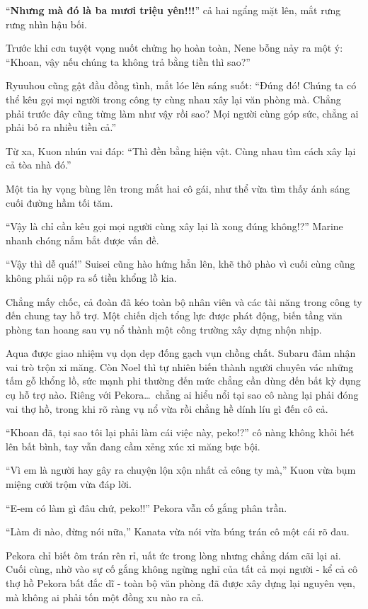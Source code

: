 \documentclass[../main.tex]{subfiles}
\begin{document}
``\textbf{Nhưng mà đó là ba mươi triệu yên!!!}'' cả hai ngẩng mặt lên, mắt rưng rưng nhìn hậu bối.

Trước khi cơn tuyệt vọng nuốt chửng họ hoàn toàn, Nene bỗng nảy ra một ý: ``Khoan, vậy nếu chúng ta không trả bằng tiền thì sao?''

Ryuuhou cũng gật đầu đồng tình, mắt lóe lên sáng suốt: ``Đúng đó! Chúng ta có thể kêu gọi mọi người trong công ty cùng nhau xây lại văn phòng mà. Chẳng phải trước đây cũng từng làm như vậy rồi sao? Mọi người cùng góp sức, chẳng ai phải bỏ ra nhiều tiền cả.''

Từ xa, Kuon nhún vai đáp: ``Thì đền bằng hiện vật. Cùng nhau tìm cách xây lại cả tòa nhà đó.''

Một tia hy vọng bùng lên trong mắt hai cô gái, như thể vừa tìm thấy ánh sáng cuối đường hầm tối tăm.

``Vậy là chỉ cần kêu gọi mọi người cùng xây lại là xong đúng không!?'' Marine nhanh chóng nắm bắt được vấn đề.

``Vậy thì dễ quá!'' Suisei cũng hào hứng hẳn lên, khẽ thở phào vì cuối cùng cũng không phải nộp ra số tiền khổng lồ kia.

\ct

Chẳng mấy chốc, cả đoàn đã kéo toàn bộ nhân viên và các tài năng trong công ty đến chung tay hỗ trợ. Một chiến dịch tổng lực được phát động, biến tầng văn phòng tan hoang sau vụ nổ thành một công trường xây dựng nhộn nhịp.

Aqua được giao nhiệm vụ dọn dẹp đống gạch vụn chồng chất. Subaru đảm nhận vai trò trộn xi măng. Còn Noel thì tự nhiên biến thành người chuyên vác những tấm gỗ khổng lồ, sức mạnh phi thường đến mức chẳng cần dùng đến bất kỳ dụng cụ hỗ trợ nào. Riêng với Pekora\dots\ chẳng ai hiểu nổi tại sao cô nàng lại phải đóng vai thợ hồ, trong khi rõ ràng vụ nổ vừa rồi chẳng hề dính líu gì đến cô cả.

``Khoan đã, tại sao tôi lại phải làm cái việc này, peko!?'' cô nàng không khỏi hét lên bất bình, tay vẫn đang cầm xẻng xúc xi măng bực bội.

``Vì em là người hay gây ra chuyện lộn xộn nhất cả công ty mà,'' Kuon vừa bụm miệng cười trộm vừa đáp lời.

``E-em có làm gì đâu chứ, peko!!'' Pekora vẫn cố gắng phân trần.

``Làm đi nào, đừng nói nữa,'' Kanata vừa nói vừa búng trán cô một cái rõ đau.

Pekora chỉ biết ôm trán rên rỉ, uất ức trong lòng nhưng chẳng dám cãi lại ai. Cuối cùng, nhờ vào sự cố gắng không ngừng nghỉ của tất cả mọi người - kể cả cô thợ hồ Pekora bất đắc dĩ - toàn bộ văn phòng đã được xây dựng lại nguyên vẹn, mà không ai phải tốn một đồng xu nào ra cả.
\end{document}
